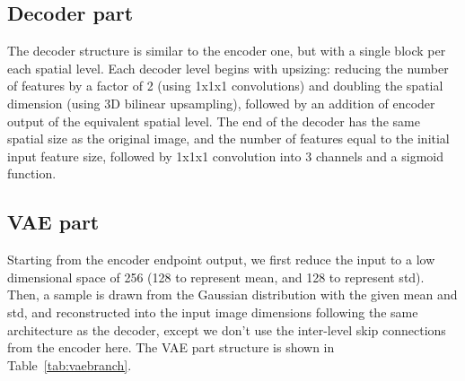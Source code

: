 \documentclass[runningheads]{llncs}
\begin{document}
 \subsection{Decoder part}

The decoder structure is similar to the encoder one, but with a single block per each spatial level. Each decoder level begins with upsizing: reducing the number of features  by a factor of 2 (using 1x1x1 convolutions) and doubling the spatial dimension (using 3D bilinear upsampling),  followed by an addition of encoder output of the equivalent spatial level. The end of the decoder has the same spatial size as the original image, and the number of features equal to the initial input feature size, followed by 1x1x1 convolution into 3 channels and a sigmoid function. 

%


 \subsection{VAE part}
 Starting from the encoder endpoint output, we first reduce the input to a low dimensional space of 256  (128 to represent mean, and 128 to represent std). Then, a sample is drawn from the Gaussian distribution with the given mean and std, and reconstructed into the input image dimensions following the same architecture as the decoder, except we don't use the inter-level skip connections from the encoder here. The VAE part structure is shown in Table~\ref{tab:vaebranch}.
 
\end{document}
